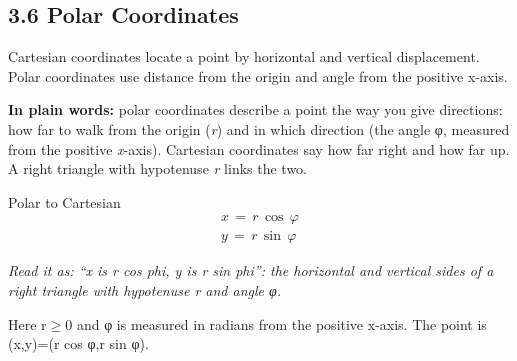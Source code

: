 \documentclass[11pt]{article}
\begin{document}
\begin{keepsection}
\section{3.6 Polar Coordinates}

Cartesian coordinates locate a point by horizontal and vertical displacement. Polar coordinates use distance from the origin and angle from the positive x-axis.

\begin{plainbox}\textbf{In plain words:} polar coordinates describe a point the way you give directions: how far to walk from the origin (\textit{r}) and in which direction (the angle φ, measured from the positive \textit{x}-axis). Cartesian coordinates say how far right and how far up. A right triangle with hypotenuse \textit{r} links the two.\end{plainbox}

\begin{equationcard}{Polar to Cartesian}
\[ \begin{gathered} {x}\, =\, {r}\, \cos \, φ \\ {y}\, =\, {r}\, \sin \, φ \end{gathered} \]
{\small \emph{Read it as: “x is r cos phi, y is r sin phi”: the horizontal and vertical sides of a right triangle with hypotenuse r and angle φ.}\par Here r\ensuremath{\geq}0 and φ is measured in radians from the positive x-axis. The point is (x,y)=(r cos φ,r sin φ).}
\end{equationcard}


\end{keepsection}
\end{document}
